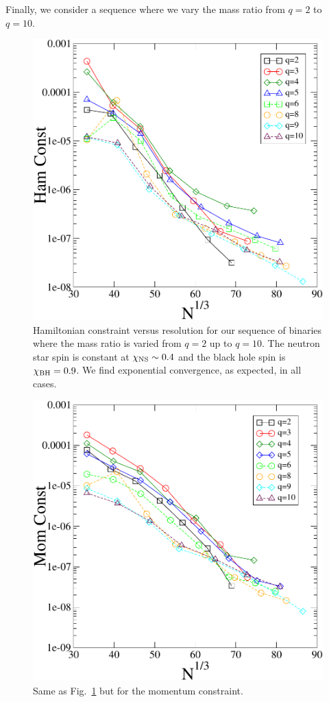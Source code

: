 Finally, we consider a sequence where we vary the mass ratio from
$q=2$ to $q=10$. 

\begin{figure}
\includegraphics[width=0.95\columnwidth]{chap4/qSeqHam}
\caption[]{\label{fig:qSeqHam}Hamiltonian constraint versus resolution for our sequence of binaries where the mass ratio is varied from $q=2$ up to $q=10$. The neutron star spin is constant at $\chi_{\rm NS}\sim 0.4$ and the black hole spin is $\chi_{\rm BH}=0.9$. We find exponential convergence, as expected, in all cases.}
\end{figure}

\begin{figure}
\includegraphics[width=0.95\columnwidth]{chap4/qSeqMom}
\caption[]{\label{fig:qSeqMom} Same as Fig.~\ref{fig:qSeqHam}
  but for the momentum constraint.}
\end{figure}

